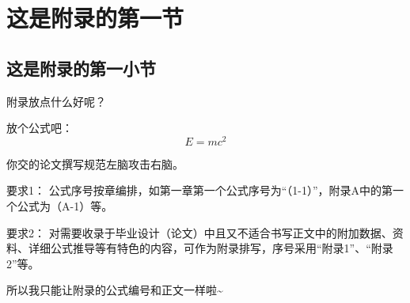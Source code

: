 
\section{这是附录的第一节}

\subsection{这是附录的第一小节}

附录放点什么好呢？

放个公式吧：
\begin{equation}
    E = mc^2
\end{equation}

你交的论文撰写规范左脑攻击右脑。

要求1：
公式序号按章编排，如第一章第一个公式序号为“（1-1）”，附录A中的第一个公式为（A-1）等。

要求2：
对需要收录于毕业设计（论文）中且又不适合书写正文中的附加数据、资料、详细公式推导等有特色的内容，可作为附录排写，序号采用“附录1”、“附录2”等。

所以我只能让附录的公式编号和正文一样啦\~{}